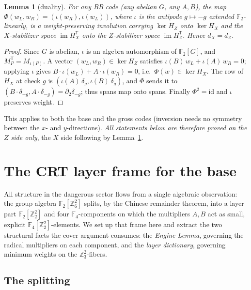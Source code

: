 \documentclass[11pt]{article}
\newcommand{\Z}{\mathbb{Z}}
\newcommand{\F}[1]{\mathbb{F}_{#1}}
\DeclareMathOperator{\img}{im}
\theoremstyle{plain}
\newtheorem{lemma}{Lemma}[section]
\theoremstyle{definition}
\theoremstyle{remark}
\begin{document}
\begin{lemma}[duality]\label{lem:duality}
For any BB code (any abelian $G$, any $A,B$), the map
$\Phi(w_L,w_R)=(\iota(w_R),\iota(w_L))$, where $\iota$ is the antipode $g\mapsto -g$
extended $\F2$-linearly, is a weight-preserving involution carrying $\ker H_Z$ onto
$\ker H_X$ and the $X$-stabilizer space $\img H_X^{\mathsf T}$ onto the $Z$-stabilizer
space $\img H_Z^{\mathsf T}$. Hence $d_X=d_Z$.
\end{lemma}

\begin{proof}
Since $G$ is abelian, $\iota$ is an algebra automorphism of $\F2[G]$, and
$M_P^{\mathsf T}=M_{\iota(P)}$. A vector $(w_L,w_R)\in\ker H_Z$ satisfies
$\iota(B)\,w_L+\iota(A)\,w_R=0$; applying $\iota$ gives $B\cdot\iota(w_L)+A\cdot\iota(w_R)=0$,
i.e.\ $\Phi(w)\in\ker H_X$. The row of $H_X$ at check $g$ is $(\iota(A)\,\delta_g,\iota(B)\,\delta_g)$,
and $\Phi$ sends it to $(B\cdot\delta_{-g},A\cdot\delta_{-g})=\partial_2\delta_{-g}$; thus
spans map onto spans. Finally $\Phi^2=\mathrm{id}$ and $\iota$ preserves weight.
\end{proof}

This applies to both the base and the gross codes (inversion needs no symmetry between the
$x$- and $y$-directions). \emph{All statements below are therefore proved on the $Z$ side
only}, the $X$ side following by Lemma~\ref{lem:duality}.
\section{The CRT layer frame for the base}\label{sec:crtframe}

All structure in the dangerous sector flows from a single algebraic
observation: the group algebra $\F2[\Z_6^2]$ splits, by the Chinese remainder
theorem, into a layer part $\F2[\Z_2^2]$ and four $\F4$-components on which the
multipliers $A,B$ act as small, explicit $\F4[\Z_2^2]$-elements. We set up that
frame here and extract the two structural facts the cover argument consumes:
the \emph{Engine Lemma}, governing the radical multipliers on each component,
and the \emph{layer dictionary}, governing minimum weights on the
$\Z_3^2$-fibers.

\subsection{The splitting}
\end{document}
